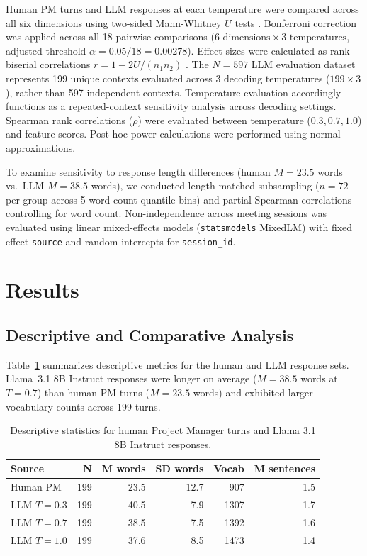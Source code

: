 \documentclass[preprint,12pt,authoryear]{elsarticle}
\begin{document}
Human PM turns and LLM responses at each temperature were compared across all six dimensions using two-sided Mann-Whitney $U$ tests \citep{mann1947test}. Bonferroni correction was applied across all 18 pairwise comparisons ($6 \text{ dimensions} \times 3 \text{ temperatures}$, adjusted threshold $\alpha = 0.05 / 18 = 0.00278$). Effect sizes were calculated as rank-biserial correlations $r = 1 - 2U/(n_1 n_2)$ \citep{rosenthal1994parametric}. The $N = 597$ LLM evaluation dataset represents 199 unique contexts evaluated across 3 decoding temperatures ($199 \times 3$), rather than 597 independent contexts. Temperature evaluation accordingly functions as a repeated-context sensitivity analysis across decoding settings. Spearman rank correlations ($\rho$) were evaluated between temperature ($0.3, 0.7, 1.0$) and feature scores. Post-hoc power calculations were performed using normal approximations.

To examine sensitivity to response length differences (human $M = 23.5$ words vs.\ LLM $M = 38.5$ words), we conducted length-matched subsampling ($n = 72$ per group across 5 word-count quantile bins) and partial Spearman correlations controlling for word count. Non-independence across meeting sessions was evaluated using linear mixed-effects models (\texttt{statsmodels} MixedLM) with fixed effect \texttt{source} and random intercepts for \texttt{session\_id}.

\section{Results}

\subsection{Descriptive and Comparative Analysis}

Table~\ref{tab:descriptive} summarizes descriptive metrics for the human and LLM response sets. Llama~3.1 8B Instruct responses were longer on average ($M = 38.5$ words at $T=0.7$) than human PM turns ($M = 23.5$ words) and exhibited larger vocabulary counts across 199 turns.

\begin{table}[htbp]
\centering
\caption{Descriptive statistics for human Project Manager turns and Llama 3.1 8B Instruct responses.}
\label{tab:descriptive}
\small
\begin{tabular}{lrrrrr}
\toprule
\textbf{Source} & \textbf{N} & \textbf{M words} & \textbf{SD words} & \textbf{Vocab} & \textbf{M sentences} \\
\midrule
Human PM & 199 & 23.5 & 12.7 &  907 & 1.5 \\
LLM $T\!=\!0.3$ & 199 & 40.5 &  7.9 & 1307 & 1.7 \\
LLM $T\!=\!0.7$ & 199 & 38.5 &  7.5 & 1392 & 1.6 \\
LLM $T\!=\!1.0$ & 199 & 37.6 &  8.5 & 1473 & 1.4 \\
\bottomrule
\end{tabular}
\end{table}
\end{document}
